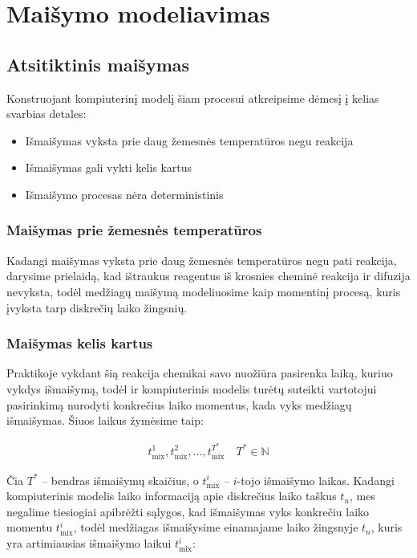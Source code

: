 
\section{Maišymo modeliavimas}

\subsection{Atsitiktinis maišymas}

Konstruojant kompiuterinį modelį šiam procesui atkreipsime dėmesį į kelias svarbias detales:

\begin{itemize}
  \item Išmaišymas vyksta prie daug žemesnės temperatūros negu reakcija
  \item Išmaišymas gali vykti kelis kartus
  \item Išmaišymo procesas nėra deterministinis
\end{itemize}

\subsubsection*{Maišymas prie žemesnės temperatūros}

Kadangi maišymas vyksta prie daug žemesnės temperatūros negu pati reakcija, darysime prielaidą, kad ištraukus reagentus iš krosnies cheminė reakcija ir difuzija nevyksta, todėl medžiagų maišymą modeliuosime kaip momentinį procesą, kuris įvyksta tarp diskrečių laiko žingsnių.

\subsubsection*{Maišymas kelis kartus}

Praktikoje vykdant šią reakcija chemikai savo nuožiūra pasirenka laiką, kuriuo vykdys išmaišymą, todėl ir kompiuterinis modelis turėtų suteikti vartotojui pasirinkimą nurodyti konkrečius laiko momentus, kada vyks medžiagų išmaišymas. Šiuos laikus žymėsime taip:

\begin{align}
    t^1_\text{mix}, t^2_\text{mix}, \dots, t^{T^*}_\text{mix} \quad T^*\in \mathbb{N}
\end{align}

Čia $T^*$ -- bendras išmaišymų skaičius, o $t^i_\text{mix}$ -- $i$-tojo išmaišymo laikas. Kadangi kompiuterinis modelis laiko informaciją apie diskrečius laiko taškus $t_n$, mes negalime tiesiogiai apibrėžti sąlygos, kad išmaišymas vyks konkrečiu laiko momentu $t^i_\text{mix}$, todėl medžiagas išmaišysime einamajame laiko žingsnyje $t_n$, kuris yra artimiausias išmaišymo laikui $t^i_\text{mix}$:

